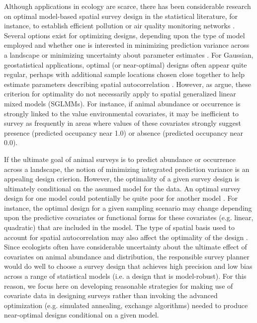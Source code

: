 \documentclass[fleqn,10pt]{wlpeerj}
\begin{document}
Although applications in ecology are scarce, there has been considerable research on optimal model-based spatial survey design in the statistical literature, for instance, to establish efficient pollution or air quality monitoring networks \citep[e.g.][]{CaseltonZidek1984,Muller2001}. 
Several options exist for optimizing designs, depending upon the type of model employed and whether one is interested in minimizing prediction variance across a landscape or minimizing uncertainty about parameter estimates \citep{Muller2001,DiggleLophaven2006,XiaEtAl2006}. For Gaussian, geostatistical applications, optimal (or near-optimal) designs often appear quite regular, perhaps with additional sample locations chosen close together to help estimate parameters describing spatial autocorrelation \citep{Lark2002,DiggleLophaven2006}.  However, as \citet{EvangelouZhu2012} argue, these criterion for optimality do not necessarily apply to spatial generalized linear mixed models (SGLMMs).  For instance, if animal abundance or occurrence is strongly linked to the value environmental covariates, it may be inefficient to survey as frequently in areas where values of these covariates strongly suggest presence (predicted occupancy near 1.0) or absence (predicted occupancy near 0.0).

If the ultimate goal of animal surveys is to  predict abundance or occurrence across a landscape, the notion of minimizing integrated prediction variance is an appealing design crierion.  However, the optimality of a given survey design is ultimately conditional on the assumed model for the data. An optimal survey design for one model could potentially be quite poor for another model \citep{Muller2001}.  For instance, the optimal design for a given sampling scenario may change depending upon the predictive covariates or functional forms for these covariates (e.g. linear, quadratic) that are included in the model.  The type of spatial basis used to account for spatial autocorrelation may also affect the optimality of the design \citep[e.g. via placement of knots across a landscape,][]{FinleyEtAl2009,GelfandEtAl2012}.  Since ecologists often have considerable uncertainty about the ultimate effect of covariates on animal abundance and distribution, the responsible survey planner would do well to choose a survey design that achieves high precision and low bias across a range of statistical models (i.e. a design that is model-robust).  For this reason, we focus here on developing reasonable strategies for making use of covariate data in designing surveys rather than invoking the advanced optimization (e.g. simulated annealing, exchange algorithms) needed to produce near-optimal designs conditional on a given model.
\end{document}
